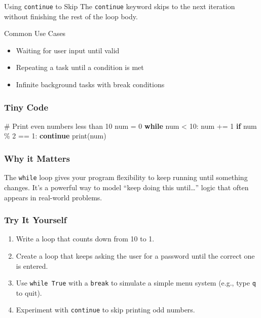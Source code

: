 \documentclass[
  letterpaper,
  DIV=11,
  numbers=noendperiod]{scrreprt}
\newenvironment{Shaded}{\begin{snugshade}}{\end{snugshade}}
\newcommand{\BuiltInTok}[1]{\textcolor[rgb]{0.00,0.23,0.31}{#1}}
\newcommand{\CommentTok}[1]{\textcolor[rgb]{0.37,0.37,0.37}{#1}}
\newcommand{\ControlFlowTok}[1]{\textcolor[rgb]{0.00,0.23,0.31}{\textbf{#1}}}
\newcommand{\DecValTok}[1]{\textcolor[rgb]{0.68,0.00,0.00}{#1}}
\newcommand{\NormalTok}[1]{\textcolor[rgb]{0.00,0.23,0.31}{#1}}
\newcommand{\OperatorTok}[1]{\textcolor[rgb]{0.37,0.37,0.37}{#1}}
\providecommand{\tightlist}{%
  \setlength{\itemsep}{0pt}\setlength{\parskip}{0pt}}
\begin{document}
Using \texttt{continue} to Skip The \texttt{continue} keyword skips to
the next iteration without finishing the rest of the loop body.

Common Use Cases

\begin{itemize}
\tightlist
\item
  Waiting for user input until valid
\item
  Repeating a task until a condition is met
\item
  Infinite background tasks with break conditions
\end{itemize}

\subsubsection{Tiny Code}\label{tiny-code-17}

\begin{Shaded}
\begin{Highlighting}[]
\CommentTok{\# Print even numbers less than 10}
\NormalTok{num }\OperatorTok{=} \DecValTok{0}
\ControlFlowTok{while}\NormalTok{ num }\OperatorTok{\textless{}} \DecValTok{10}\NormalTok{:}
\NormalTok{    num }\OperatorTok{+=} \DecValTok{1}
    \ControlFlowTok{if}\NormalTok{ num }\OperatorTok{\%} \DecValTok{2} \OperatorTok{==} \DecValTok{1}\NormalTok{:}
        \ControlFlowTok{continue}
    \BuiltInTok{print}\NormalTok{(num)}
\end{Highlighting}
\end{Shaded}

\subsubsection{Why it Matters}\label{why-it-matters-17}

The \texttt{while} loop gives your program flexibility to keep running
until something changes. It's a powerful way to model ``keep doing this
until\ldots{}'' logic that often appears in real-world problems.

\subsubsection{Try It Yourself}\label{try-it-yourself-17}

\begin{enumerate}
\def\labelenumi{\arabic{enumi}.}
\tightlist
\item
  Write a loop that counts down from 10 to 1.
\item
  Create a loop that keeps asking the user for a password until the
  correct one is entered.
\item
  Use \texttt{while\ True} with a \texttt{break} to simulate a simple
  menu system (e.g., type \texttt{q} to quit).
\item
  Experiment with \texttt{continue} to skip printing odd numbers.
\end{enumerate}
\end{document}
